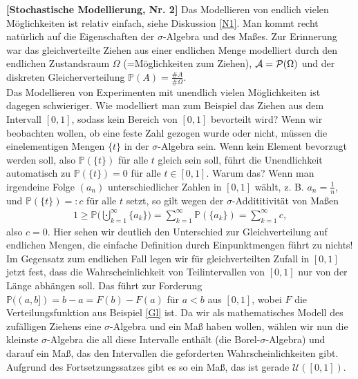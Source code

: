 \begin{disc}
 \textbf{[Stochastische Modellierung, Nr. 2]}
	Das Modellieren von endlich vielen Möglichkeiten ist relativ einfach, siehe Diskussion \ref{N1}. Man kommt recht nat\"urlich auf die Eigenschaften der $\sigma$-Algebra und des Ma\ss es. Zur Erinnerung war das gleichverteilte Ziehen aus einer endlichen Menge modelliert durch den endlichen Zustandsraum $\Omega$ (=M\"oglichkeiten zum Ziehen), $\mathcal{A} = \mathcal{P}(\Omega)$ und der diskreten Gleicherverteilung $\mathbb{P}(A) = \frac{\# A}{\# \Omega}$.\\ Das Modellieren von Experimenten mit unendlich vielen Möglichkeiten ist dagegen schwieriger. Wie modelliert man zum Beispiel das Ziehen aus dem Intervall $[0,1]$, sodass kein Bereich von $[0,1]$ bevorteilt wird? Wenn wir beobachten wollen, ob eine feste Zahl gezogen wurde oder nicht, m\"ussen die einelementigen Mengen $\{t\}$ in der $\sigma$-Algebra sein. Wenn kein Element bevorzugt werden soll, also $\mathbb P(\{t\})$ f\"ur alle $t$ gleich sein soll, f\"uhrt die Unendlichkeit automatisch zu $\mathbb P(\{t\})=0$ f\"ur alle $t\in [0,1]$. Warum das? Wenn man irgendeine Folge $(a_n)$ unterschiedlicher Zahlen in $[0,1]$ w\"ahlt, z. B. $a_n=\frac 1 n$, und $\mathbb P(\{t\})=:c$ f\"ur alle $t$ setzt, so gilt wegen der $\sigma$-Addititivit\"at von Ma\ss en
	\begin{align*}
		1\geq \mathbb P\big(\bigcupdot_{k=1}^\infty \{a_k\}\big) =\sum_{k=1}^\infty \mathbb P(\{a_k\})=\sum_{k=1}^\infty c,
	\end{align*}
	also $c=0$. Hier sehen wir deutlich den Unterschied zur Gleichverteilung auf endlichen Mengen, die einfache Definition durch Einpunktmengen f\"uhrt zu nichts! Im Gegensatz zum endlichen Fall legen wir f\"ur gleichverteilten Zufall in $[0,1]$ jetzt fest, dass die Wahrscheinlichkeit von Teilintervallen von $[0,1]$ nur von der L\"ange abh\"angen soll. Das f\"uhrt zur Forderung $\mathbb P((a,b])=b-a=F(b)-F(a)$ f\"ur $a<b$ aus $[0,1]$, wobei $F$ die Verteilungsfunktion aus Beispiel \ref{Gl} ist. Da wir als mathematisches Modell des zuf\"alligen Ziehens eine $\sigma$-Algebra und ein Ma\ss{} haben wollen, w\"ahlen wir nun die kleinste $\sigma$-Algebra die all diese Intervalle enth\"alt (die Borel-$\sigma$-Algebra) und darauf ein Ma\ss, das den Intervallen die geforderten Wahrscheinlichkeiten gibt. Aufgrund des Fortsetzungssatzes gibt es so ein Ma\ss, das ist gerade $\mathcal U([0,1])$.
\end{disc}

